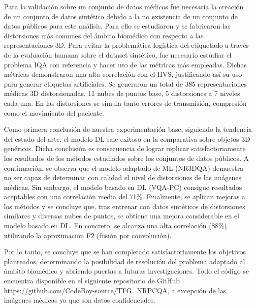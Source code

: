 Para la validación sobre un conjunto de datos médicos fue necesaria la creación 
de un conjunto de datos sintético debido a la no existencia de un conjunto de 
datos públicos para este análisis. Para ello se estudiaron y se fabricaron las distorsiones más 
comunes del ámbito biomédico con respecto a las representaciones 3D. 
Para evitar la problemática logística del etiquetado a través de la 
evaluación humana sobre el dataset sintético, 
fue necesario estudiar el problema IQA con referencia y hacer uso de las métricas 
más empleadas. Dichas métricas demonstraron una alta correlación con el HVS, 
justificando así su uso para generar etiquetas artificiales.
Se generaron un total de 385 representaciones médicas 3D distorsionadas, 11 nubes de puntos 
base, 5 distorsiones a 7 niveles cada una. En las distorsiones se simula 
tanto errores de transmisión, compresión como el movimiento del paciente.

Como primera conclusión de nuestra experimentación base, 
siguiendo la tendencia del estado del arte, el modelo DL sale exitoso en la 
comparativa sobre objetos 3D genéricos. Dicha conclusión es consecuencia 
de lograr replicar satisfactoriamente los resultados de los métodos estudiados 
sobre los conjuntos de datos públicos.
A continuación, se observa que el modelo adaptado de ML (NR3DQA) demuestra no 
ser capaz de determinar con calidad el nivel de distorsiones de las imágenes médicas. 
Sin embargo, el modelo basado en DL (VQA-PC) consigue resultados aceptables con 
una correlación media del 71\%.
Finalmente, se aplican mejoras a los métodos 
y se concluye que, tras entrenar con datos sintéticos de distorsiones similares y 
diversas nubes de puntos, se obtiene una mejora considerable en el modelo basado en DL. 
En concreto, se alcanza una alta correlación (88\%) utilizando la aproximación F2 
(fusión por convolución).

Por lo tanto, se concluye que se han completado satisfactoriamente los objetivos 
planteados, determinando la posibilidad de resolución del problema adaptado 
al ámbito biomédico y abriendo puertas a futuras investigaciones. 
Todo el código se encuentra disponible en el siguiente repositorio de 
GitHub \url{https://github.com/CodeBoy-source/TFG_NRPCQA},
a excepción de las imágenes médicas ya que son datos confidenciales.

